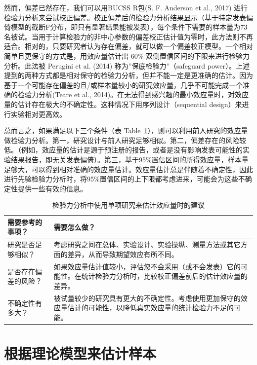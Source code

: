 \documentclass[
  letterpaper,
  DIV=11,
  numbers=noendperiod]{scrreprt}
\begin{document}
然而，偏差已然存在，我们可以用BUCSS R包(S. F. Anderson et al., 2017)
进行检验力分析来尝试校正偏差。校正偏差后的检验力分析结果显示（基于特定发表偏倚模型的截断F分布，即只有显著结果能被发表），每个条件下需要的样本量为73名被试。当用于计算检验力的非中心参数的偏差校正估计值为零时，此方法则不再适合。相对的，只要研究者认为存在偏差，就可以做一个偏差校正模型。一个相对简单且更保守的方式是，用效应量估计出
60\% 双侧置信区间的下限来进行检验力分析。此法被 Perugini et al. (2014)
称为''保底检验力''（safeguard
power）。上述提到的两种方式都是相对保守的检验力分析，但并不能一定是更准确的估计。因为基于一个可能存在偏差的且/或样本量较小的研究效应量，几乎不可能完成一个准确的检验力分析(Teare
et al.,
2014)。在无法得到感兴趣的最小效应量时，对效应量的估计存在极大的不确定性。这种情况下用序列设计（sequential
design）来进行实验相对更高效。

总而言之，如果满足以下三个条件（表
Table~\ref{tbl-table-es-just}），则可以利用前人研究的效应量做检验力分析。第一，研究设计与前人研究足够相似。第二，偏差存在的风险较低。（例如，效应量的估计是源于预注册的报告，或者是没有影响发表可能性的实验结果报告，即无关发表偏倚）。第三，基于95\%置信区间的所得效应量，样本量足够大，可以得到相对准确的效应量估计。效应量估计总是伴随着不确定性，因此进行先验检验力分析时，将95\%置信区间的上下限都考虑进来，可能会为这些不确定性提供一些有效的信息。

\hypertarget{tbl-table-es-just}{}
\begin{table}
\caption{\label{tbl-table-es-just}检验力分析中使用单项研究来估计效应量时的建议 }\tabularnewline

\centering
\begin{tabular}{>{\raggedright\arraybackslash}p{5cm}|>{\raggedright\arraybackslash}p{10cm}}
\hline
需要参考的事项？ & 需要怎么做？\\
\hline
研究是否足够相似？ & 考虑研究之间在总体、实验设计、实验操纵、测量方法或其它方面的差异，从而导致期望效应有所不同。\\
\hline
是否存在偏差的风险？ & 如果效应量估计值较小，评估您不会采用（或不会发表）它的可能性。在统计检验力分析时，比较校正偏差前后的估计效应量的差异。\\
\hline
不确定性有多大？ & 被试量较少的研究具有更大的不确定性。考虑使用更加保守的效应量估计的可能性，以降低真实效应量的统计检验力不足的可能。\\
\hline
\end{tabular}
\end{table}

\hypertarget{ux6839ux636eux7406ux8bbaux6a21ux578bux6765ux4f30ux8ba1ux6837ux672c}{%
\section{根据理论模型来估计样本}\label{ux6839ux636eux7406ux8bbaux6a21ux578bux6765ux4f30ux8ba1ux6837ux672c}}
\end{document}
